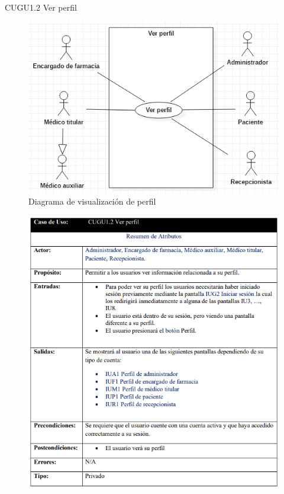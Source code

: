 \documentclass[12pt,letterpaper]{article}
\begin{document}
            \newpage
            CUGU1.2 Ver perfil
            \begin{figure}[H]
                \centering
                \includegraphics [scale=0.4]{casosUso/verPerfil}
                \caption{Diagrama de visualización de perfil}
            \end{figure}
            \begin{figure}[H]
                \centering
                \includegraphics [scale=0.7]{specs/specVerPerfil}
            \end{figure}
\end{document}
